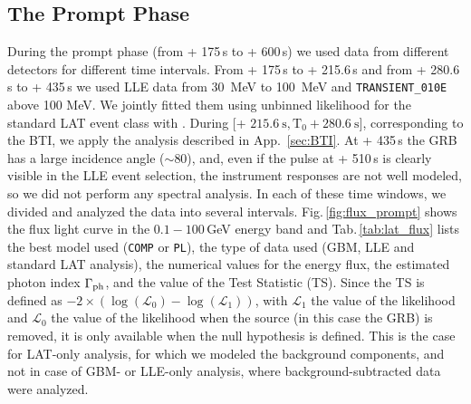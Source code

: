 \documentclass[preprint]{aastex631}
\begin{document}
\subsection{The Prompt Phase}
\label{sec:prompt}
During the prompt phase (from \trig+ 175\,s to \trig+ 600\,s) we used data from different detectors for different time intervals. 
From \trig+ 175\,s to \trig+ 215.6\,s and from \trig+ 280.6\,s to \trig+ 435\,s we used LLE data from 30~MeV to 100~MeV and \texttt{TRANSIENT\_010E} above 100 MeV. We jointly fitted them using unbinned likelihood for the standard LAT event class with \ThreeML. During [\trig + $ 215.6~\mathrm{s},\mathrm{T}_0+280.6~\mathrm{s}]$, corresponding to the BTI, we apply the analysis described in App.~\ref{sec:BTI}. At \trig+ 435\,s the GRB has a large incidence angle ($\sim$80\deg), and, even if the pulse at \trig+ 510\,s is clearly visible in the LLE event selection, the instrument responses are not well modeled, so we did not perform any spectral analysis. 
In each of these time windows, we divided and analyzed the data into several intervals. Fig.\,\ref{fig:flux_prompt} shows the flux light curve in the $0.1-100$\,GeV energy band and Tab.\,\ref{tab:lat_flux} lists the best model used (\texttt{COMP} or \texttt{PL}), the type of data used (GBM, LLE and standard LAT analysis), the numerical values for the energy flux, the estimated photon index $\Gamma_{\rm ph}$, and the value of the Test Statistic (TS). 
Since the TS is defined as $-2\times(\log(\mathcal{L}_{0}) - \log(\mathcal{L}_{1}))$, with $\mathcal{L}_{1}$ the value of the likelihood and $\mathcal{L}_{0}$ the value of the likelihood when the source (in this case the GRB) is removed, it is only available when the null hypothesis is defined.
This is the case for LAT-only analysis, for which we modeled the background components, and not in case of GBM- or LLE-only analysis, where background-subtracted data were analyzed.
\end{document}
